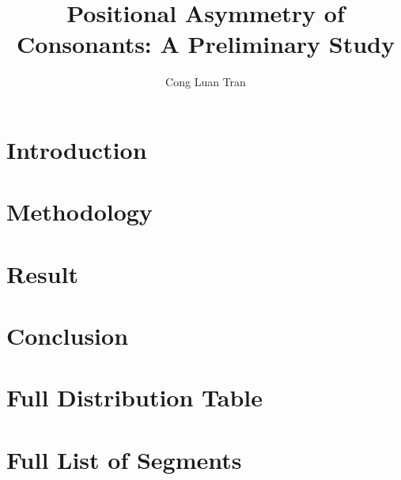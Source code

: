 \documentclass[12pt]{report}
\title{Positional Asymmetry of Consonants: A Preliminary Study}
\author{Cong Luan Tran}
\begin{document}


\tableofcontents

\chapter{Introduction}


\chapter{Methodology}


\chapter{Result}


\chapter{Conclusion}


\appendix
\chapter{Full Distribution Table}


\chapter{Full List of Segments}


\printbibliography
\end{document}

